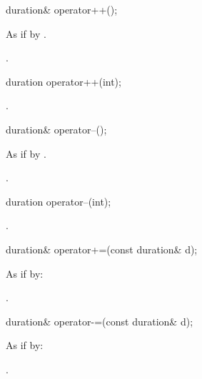 %
\begin{itemdecl}
duration& operator++();
\end{itemdecl}

\begin{itemdescr}
\pnum
\effects As if by .

\pnum
\returns {}.
\end{itemdescr}

%
\begin{itemdecl}
duration operator++(int);
\end{itemdecl}

\begin{itemdescr}
\pnum
\returns {}.
\end{itemdescr}

%
\begin{itemdecl}
duration& operator--();
\end{itemdecl}

\begin{itemdescr}
\pnum
\effects As if by .

\pnum
\returns {}.
\end{itemdescr}

%
\begin{itemdecl}
duration operator--(int);
\end{itemdecl}

\begin{itemdescr}
\pnum
\returns {}.
\end{itemdescr}

%
\begin{itemdecl}
duration& operator+=(const duration& d);
\end{itemdecl}

\begin{itemdescr}
\pnum
\effects As if by: 

\pnum
\returns {}.
\end{itemdescr}

%
\begin{itemdecl}
duration& operator-=(const duration& d);
\end{itemdecl}

\begin{itemdescr}
\pnum
\effects As if by: 

\pnum
\returns {}.
\end{itemdescr}


